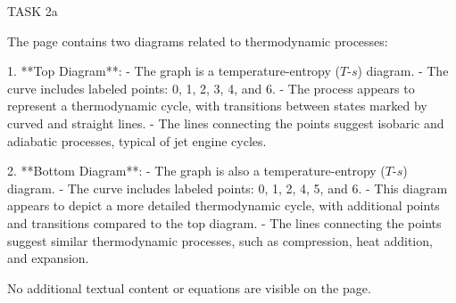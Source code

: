 TASK 2a

The page contains two diagrams related to thermodynamic processes:

1. **Top Diagram**:
   - The graph is a temperature-entropy (\( T \)-\( s \)) diagram.
   - The curve includes labeled points: 0, 1, 2, 3, 4, and 6.
   - The process appears to represent a thermodynamic cycle, with transitions between states marked by curved and straight lines.
   - The lines connecting the points suggest isobaric and adiabatic processes, typical of jet engine cycles.

2. **Bottom Diagram**:
   - The graph is also a temperature-entropy (\( T \)-\( s \)) diagram.
   - The curve includes labeled points: 0, 1, 2, 4, 5, and 6.
   - This diagram appears to depict a more detailed thermodynamic cycle, with additional points and transitions compared to the top diagram.
   - The lines connecting the points suggest similar thermodynamic processes, such as compression, heat addition, and expansion.

No additional textual content or equations are visible on the page.